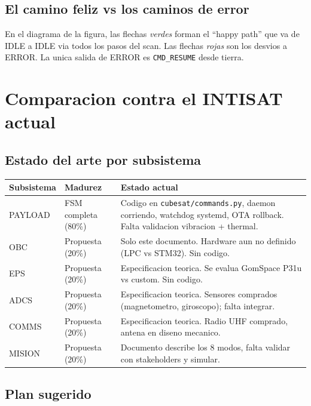 \documentclass[11pt,a4paper,oneside,openright]{book}
\begin{document}
\section{El camino feliz vs los caminos de error}

En el diagrama de la figura, las flechas \emph{verdes} forman el
``happy path'' que va de IDLE a IDLE via todos los pasos del scan.
Las flechas \emph{rojas} son los desvios a ERROR. La unica salida de
ERROR es \texttt{CMD\_RESUME} desde tierra.

\chapter{Comparacion contra el INTISAT actual}

\section{Estado del arte por subsistema}

\begin{longtable}{p{2.5cm}p{3cm}p{6cm}}
\toprule
\textbf{Subsistema} & \textbf{Madurez} & \textbf{Estado actual} \\
\midrule \endhead
PAYLOAD & FSM completa (80\%) &
  Codigo en \texttt{cubesat/commands.py}, daemon corriendo,
  watchdog systemd, OTA rollback. Falta validacion vibracion +
  thermal. \\
\midrule
OBC & Propuesta (20\%) &
  Solo este documento. Hardware aun no definido (LPC vs STM32).
  Sin codigo. \\
\midrule
EPS & Propuesta (20\%) &
  Especificacion teorica. Se evalua GomSpace P31u vs custom.
  Sin codigo. \\
\midrule
ADCS & Propuesta (20\%) &
  Especificacion teorica. Sensores comprados (magnetometro,
  giroscopo); falta integrar. \\
\midrule
COMMS & Propuesta (20\%) &
  Especificacion teorica. Radio UHF comprado, antena en diseno
  mecanico. \\
\midrule
MISION & Propuesta (20\%) &
  Documento describe los 8 modos, falta validar con stakeholders
  y simular. \\
\bottomrule
\end{longtable}

\section{Plan sugerido}
\end{document}
